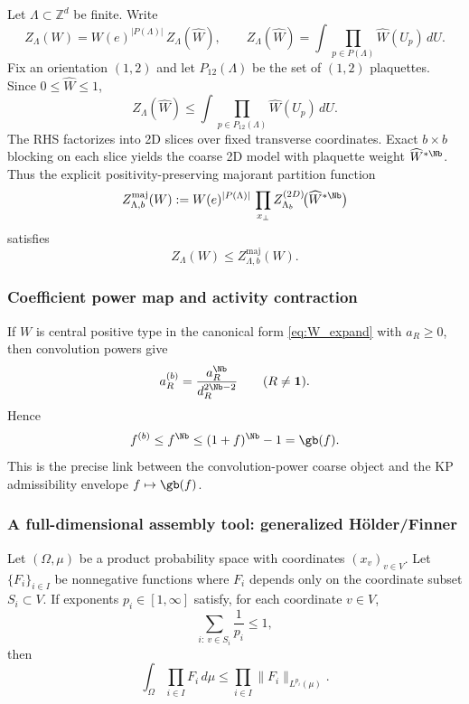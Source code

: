 Let $\Lambda\subset\mathbb Z^d$ be finite.
Write
\[
Z_{\Lambda}(W)=W(e)^{|P(\Lambda)|}\,Z_{\Lambda}(\widehat W),
\qquad
Z_{\Lambda}(\widehat W)=\int\prod_{p\in P(\Lambda)} \widehat W(U_p)\,dU.
\]
Fix an orientation $(1,2)$ and let $P_{12}(\Lambda)$ be the set of $(1,2)$ plaquettes.
Since $0\le \widehat W\le 1$,
\begin{equation}\label{eq:drop_to_planes}
Z_{\Lambda}(\widehat W)
\le
\int\prod_{p\in P_{12}(\Lambda)} \widehat W(U_p)\,dU.
\end{equation}
The RHS factorizes into 2D slices over fixed transverse coordinates.
Exact $b\times b$ blocking on each slice yields the coarse 2D model with plaquette weight $\widehat W^{*\Nb}$.
Thus the explicit positivity-preserving majorant partition function
\begin{equation}\label{eq:Z_majorant_def}
Z^{\mathrm{maj}}_{\Lambda,b}(W)
:=W(e)^{|P(\Lambda)|}\,\prod_{x_{\perp}} Z^{(2D)}_{\Lambda_b}\!\bigl(\widehat W^{*\Nb}\bigr)
\end{equation}
satisfies
\begin{equation}\label{eq:Z_majorant_ineq}
Z_{\Lambda}(W)\le Z^{\mathrm{maj}}_{\Lambda,b}(W).
\end{equation}

\subsubsection{Coefficient power map and activity contraction}

If $W$ is central positive type in the canonical form \eqref{eq:W_expand} with $a_R\ge 0$, then convolution powers give
\begin{equation}\label{eq:a_power_map}
 a_R^{(b)}=\frac{a_R^{\Nb}}{d_R^{2\Nb-2}}\qquad(R\ne\mathbf 1).
\end{equation}
Hence
\begin{equation}\label{eq:fb_le_fNb}
 f^{(b)}\le f^{\Nb}\le (1+f)^{\Nb}-1=\gb(f).
\end{equation}
This is the precise link between the convolution-power coarse object and the KP admissibility envelope $f\mapsto \gb(f)$.

\subsubsection{A full-dimensional assembly tool: generalized H\"older/Finner}

\begin{lemma}\label{lem:finner}
Let $(\Omega,\mu)$ be a product probability space with coordinates $(x_v)_{v\in V}$.
Let $\{F_i\}_{i\in I}$ be nonnegative functions where $F_i$ depends only on the coordinate subset $S_i\subset V$.
If exponents $p_i\in[1,\infty]$ satisfy, for each coordinate $v\in V$,
\begin{equation}\label{eq:finner_condition}
\sum_{i:\ v\in S_i}\frac{1}{p_i}\le 1,
\end{equation}
then
\begin{equation}\label{eq:finner_ineq}
\int_\Omega \prod_{i\in I} F_i \,d\mu
\le
\prod_{i\in I}\|F_i\|_{L^{p_i}(\mu)}.
\end{equation}
\end{lemma}

